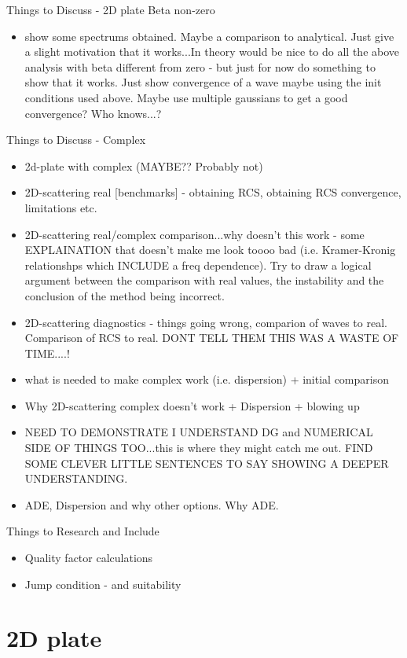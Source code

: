 Things to Discuss - 2D plate Beta non-zero
\begin{itemize}
\item show some spectrums obtained. Maybe a comparison to analytical. Just give a slight motivation that it works...In theory would be nice to do all the above analysis with beta different from zero - but just for now do something to show that it works. Just show convergence of a wave maybe using the init conditions used above. Maybe use multiple gaussians to get a good convergence? Who knows...?
\end{itemize}

Things to Discuss - Complex
\begin{itemize}
\item 2d-plate with complex (MAYBE?? Probably not)
\item 2D-scattering real [benchmarks] - obtaining RCS, obtaining RCS convergence, limitations etc.
\item 2D-scattering real/complex comparison...why doesn't this work - some EXPLAINATION that doesn't make me look toooo bad (i.e. Kramer-Kronig relationshps which INCLUDE a freq dependence). Try to draw a logical argument between the comparison with real values, the instability and the conclusion of the method being incorrect.
\item 2D-scattering diagnostics - things going wrong, comparion of waves to real. Comparison of RCS to real. DONT TELL THEM THIS WAS A WASTE OF TIME....!
\item what is needed to make complex work (i.e. dispersion) + initial comparison
\item Why 2D-scattering complex doesn't work + Dispersion + blowing up
\item NEED TO DEMONSTRATE I UNDERSTAND DG and NUMERICAL SIDE OF THINGS TOO...this is where they might catch me out. FIND SOME CLEVER LITTLE SENTENCES TO SAY SHOWING A DEEPER UNDERSTANDING.
\item ADE, Dispersion and why other options. Why ADE.
\end{itemize}

Things to Research and Include
\begin{itemize}
\item Quality factor calculations
\item Jump condition - and suitability
\end{itemize}

\section{2D plate}

